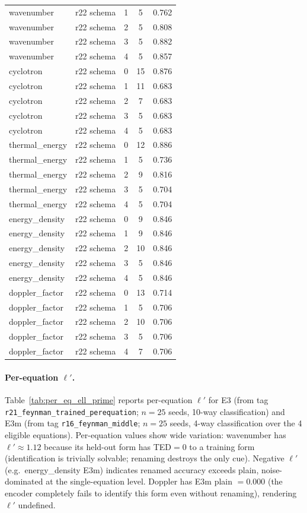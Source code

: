\begin{table}[h]
\begin{tabular}{llccc}
wavenumber & r22 schema & 1 & 5 & 0.762 \\
wavenumber & r22 schema & 2 & 5 & 0.808 \\
wavenumber & r22 schema & 3 & 5 & 0.882 \\
wavenumber & r22 schema & 4 & 5 & 0.857 \\
cyclotron & r22 schema & 0 & 15 & 0.876 \\
cyclotron & r22 schema & 1 & 11 & 0.683 \\
cyclotron & r22 schema & 2 & 7 & 0.683 \\
cyclotron & r22 schema & 3 & 5 & 0.683 \\
cyclotron & r22 schema & 4 & 5 & 0.683 \\
thermal\_energy & r22 schema & 0 & 12 & 0.886 \\
thermal\_energy & r22 schema & 1 & 5 & 0.736 \\
thermal\_energy & r22 schema & 2 & 9 & 0.816 \\
thermal\_energy & r22 schema & 3 & 5 & 0.704 \\
thermal\_energy & r22 schema & 4 & 5 & 0.704 \\
energy\_density & r22 schema & 0 & 9 & 0.846 \\
energy\_density & r22 schema & 1 & 9 & 0.846 \\
energy\_density & r22 schema & 2 & 10 & 0.846 \\
energy\_density & r22 schema & 3 & 5 & 0.846 \\
energy\_density & r22 schema & 4 & 5 & 0.846 \\
doppler\_factor & r22 schema & 0 & 13 & 0.714 \\
doppler\_factor & r22 schema & 1 & 5 & 0.706 \\
doppler\_factor & r22 schema & 2 & 10 & 0.706 \\
doppler\_factor & r22 schema & 3 & 5 & 0.706 \\
doppler\_factor & r22 schema & 4 & 7 & 0.706 \\
\bottomrule
\end{tabular}
\end{table}

\paragraph{Per-equation $\ell'$.} Table~\ref{tab:per_eq_ell_prime} reports per-equation $\ell'$ for E3 (from tag \texttt{r21\_feynman\_trained\_perequation}; $n{=}25$ seeds, 10-way classification) and E3m (from tag \texttt{r16\_feynman\_middle}; $n{=}25$ seeds, 4-way classification over the 4 eligible equations). Per-equation values show wide variation: wavenumber has $\ell'{\approx}1.12$ because its held-out form has TED${=}0$ to a training form (identification is trivially solvable; renaming destroys the only cue). Negative $\ell'$ (e.g.\ energy\_density E3m) indicates renamed accuracy exceeds plain, noise-dominated at the single-equation level. Doppler has E3m plain $= 0.000$ (the encoder completely fails to identify this form even without renaming), rendering $\ell'$ undefined.

